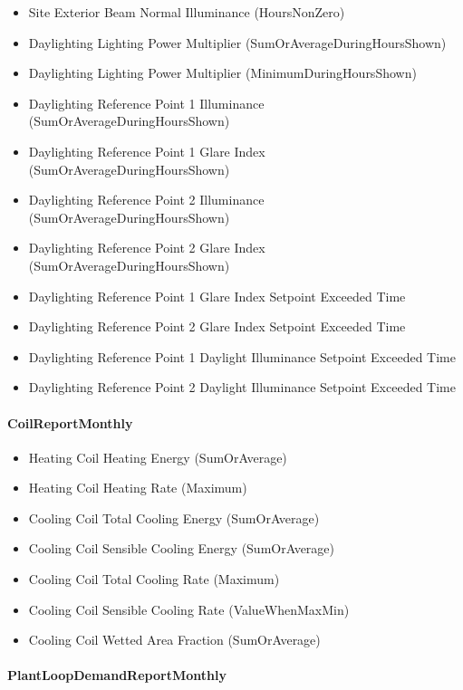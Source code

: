 \begin{itemize}
\item
  Site Exterior Beam Normal Illuminance (HoursNonZero)
\item
  Daylighting Lighting Power Multiplier (SumOrAverageDuringHoursShown)
\item
  Daylighting Lighting Power Multiplier (MinimumDuringHoursShown)
\item
  Daylighting Reference Point 1 Illuminance (SumOrAverageDuringHoursShown)
\item
  Daylighting Reference Point 1 Glare Index (SumOrAverageDuringHoursShown)
\item
  Daylighting Reference Point 2 Illuminance (SumOrAverageDuringHoursShown)
\item
  Daylighting Reference Point 2 Glare Index (SumOrAverageDuringHoursShown)
\item
  Daylighting Reference Point 1 Glare Index Setpoint Exceeded Time
\item
  Daylighting Reference Point 2 Glare Index Setpoint Exceeded Time
\item
  Daylighting Reference Point 1 Daylight Illuminance Setpoint Exceeded Time
\item
  Daylighting Reference Point 2 Daylight Illuminance Setpoint Exceeded Time
\end{itemize}

\paragraph{CoilReportMonthly}\label{coilreportmonthly}

\begin{itemize}
\item
  Heating Coil Heating Energy (SumOrAverage)
\item
  Heating Coil Heating Rate (Maximum)
\item
  Cooling Coil Total Cooling Energy (SumOrAverage)
\item
  Cooling Coil Sensible Cooling Energy (SumOrAverage)
\item
  Cooling Coil Total Cooling Rate (Maximum)
\item
  Cooling Coil Sensible Cooling Rate (ValueWhenMaxMin)
\item
  Cooling Coil Wetted Area Fraction (SumOrAverage)
\end{itemize}

\paragraph{PlantLoopDemandReportMonthly}\label{plantloopdemandreportmonthly}

